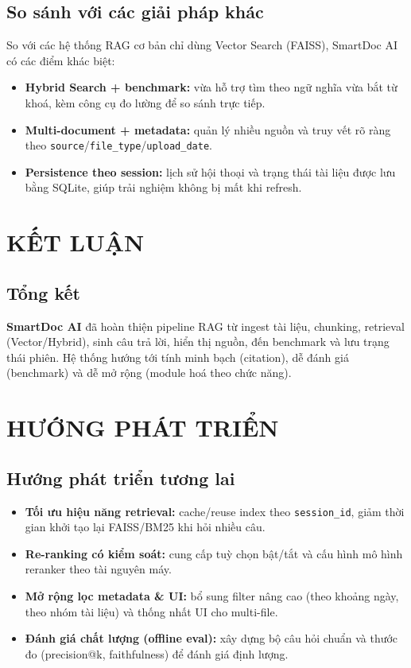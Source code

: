 \documentclass[10pt, conference, a4paper, compsocconf]{IEEEtran}
\begin{document}
\subsection{So sánh với các giải pháp khác}
So với các hệ thống RAG cơ bản chỉ dùng Vector Search (FAISS), SmartDoc AI có các điểm khác biệt:
\begin{itemize}
  \item \textbf{Hybrid Search + benchmark:} vừa hỗ trợ tìm theo ngữ nghĩa vừa bắt từ khoá, kèm công cụ đo lường để so sánh trực tiếp.
  \item \textbf{Multi-document + metadata:} quản lý nhiều nguồn và truy vết rõ ràng theo \texttt{source}/\texttt{file\_type}/\texttt{upload\_date}.
  \item \textbf{Persistence theo session:} lịch sử hội thoại và trạng thái tài liệu được lưu bằng SQLite, giúp trải nghiệm không bị mất khi refresh.
\end{itemize}

\section{KẾT LUẬN}
\subsection{Tổng kết}
\textbf{SmartDoc AI} đã hoàn thiện pipeline RAG từ ingest tài liệu, chunking, retrieval (Vector/Hybrid), sinh câu trả lời, hiển thị nguồn, đến benchmark và lưu trạng thái phiên. Hệ thống hướng tới tính minh bạch (citation), dễ đánh giá (benchmark) và dễ mở rộng (module hoá theo chức năng).

\section{HƯỚNG PHÁT TRIỂN}
\subsection{Hướng phát triển tương lai}
\begin{itemize}
  \item \textbf{Tối ưu hiệu năng retrieval:} cache/reuse index theo \texttt{session\_id}, giảm thời gian khởi tạo lại FAISS/BM25 khi hỏi nhiều câu.
  \item \textbf{Re-ranking có kiểm soát:} cung cấp tuỳ chọn bật/tắt và cấu hình mô hình reranker theo tài nguyên máy.
  \item \textbf{Mở rộng lọc metadata \& UI:} bổ sung filter nâng cao (theo khoảng ngày, theo nhóm tài liệu) và thống nhất UI cho multi-file.
  \item \textbf{Đánh giá chất lượng (offline eval):} xây dựng bộ câu hỏi chuẩn và thước đo (precision@k, faithfulness) để đánh giá định lượng.
\end{itemize}
\end{document}
